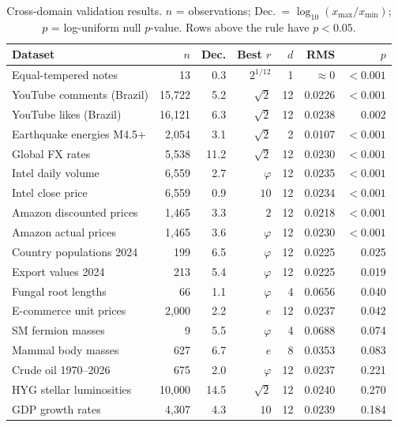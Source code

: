 \documentclass[preprint,12pt]{elsarticle}
\begin{document}
\begin{table}[htbp]
\centering
\small
\caption{Cross-domain validation results. $n$ = observations;
Dec.\ = $\log_{10}(x_{\max}/x_{\min})$; $p$ = log-uniform null
$p$-value. Rows above the rule have $p < 0.05$.}
\label{tab:validation}
\begin{tabular}{lrrrrrr}
\toprule
Dataset & $n$ & Dec. & Best $r$ & $d$ & RMS & $p$ \\
\midrule
Equal-tempered notes     &     13 &  0.3 & $2^{1/12}$ &  1 & $\approx 0$ & $<0.001$ \\
YouTube comments (Brazil)& 15,722 &  5.2 & $\sqrt{2}$ & 12 & 0.0226 & $<0.001$ \\
YouTube likes (Brazil)   & 16,121 &  6.3 & $\sqrt{2}$ & 12 & 0.0238 & 0.002 \\
Earthquake energies M4.5+&  2,054 &  3.1 & $\sqrt{2}$ &  2 & 0.0107 & $<0.001$ \\
Global FX rates          &  5,538 & 11.2 & $\sqrt{2}$ & 12 & 0.0230 & $<0.001$ \\
Intel daily volume       &  6,559 &  2.7 & $\varphi$  & 12 & 0.0235 & $<0.001$ \\
Intel close price        &  6,559 &  0.9 & $10$       & 12 & 0.0234 & $<0.001$ \\
Amazon discounted prices &  1,465 &  3.3 & $2$        & 12 & 0.0218 & $<0.001$ \\
Amazon actual prices     &  1,465 &  3.6 & $\varphi$  & 12 & 0.0230 & $<0.001$ \\
Country populations 2024 &    199 &  6.5 & $\varphi$  & 12 & 0.0225 & 0.025 \\
Export values 2024       &    213 &  5.4 & $\varphi$  & 12 & 0.0225 & 0.019 \\
Fungal root lengths      &     66 &  1.1 & $\varphi$  &  4 & 0.0656 & 0.040 \\
E-commerce unit prices   &  2,000 &  2.2 & $e$        & 12 & 0.0237 & 0.042 \\
SM fermion masses        &      9 &  5.5 & $\varphi$  &  4 & 0.0688 & 0.074 \\
Mammal body masses       &    627 &  6.7 & $e$        &  8 & 0.0353 & 0.083 \\
\midrule
Crude oil 1970--2026     &    675 &  2.0 & $\varphi$  & 12 & 0.0237 & 0.221 \\
HYG stellar luminosities & 10,000 & 14.5 & $\sqrt{2}$ & 12 & 0.0240 & 0.270 \\
GDP growth rates         &  4,307 &  4.3 & $10$       & 12 & 0.0239 & 0.184 \\
\bottomrule
\end{tabular}
\end{table}
\end{document}
